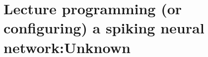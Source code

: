 \section{ Lecture programming (or configuring) a spiking neural network:Unknown }\label{sec:q4}    
